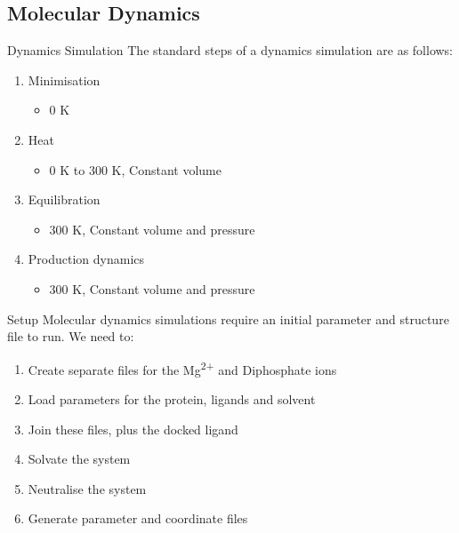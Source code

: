 \subsection{Molecular Dynamics}
\begin{frame}{Dynamics Simulation}
The standard steps of a dynamics simulation are as follows:
\vspace{1cm}
\begin{enumerate}
	\item Minimisation 
	\begin{itemize}
		\item 0 K 
	\end{itemize}
	\item Heat
	\begin{itemize}
		\item 0 K to 300 K, Constant volume
	\end{itemize}
	\item Equilibration
	\begin{itemize}
		\item 300 K, Constant volume and pressure
	\end{itemize}
	\item Production dynamics
	\begin{itemize}
		\item 300 K, Constant volume and pressure
	\end{itemize}
\end{enumerate}
\end{frame}

\begin{frame}{Setup}
Molecular dynamics simulations require an initial parameter and structure file to run.
\vspace{1cm}
\newline
We need to:
\begin{enumerate}
\item Create separate files for the Mg\textsuperscript{2+} and Diphosphate ions
\item Load parameters for the protein, ligands and solvent
\item Join these files, plus the docked ligand
\item Solvate the system
\item Neutralise the system
\item Generate parameter and coordinate files
\end{enumerate}
\end{frame}

